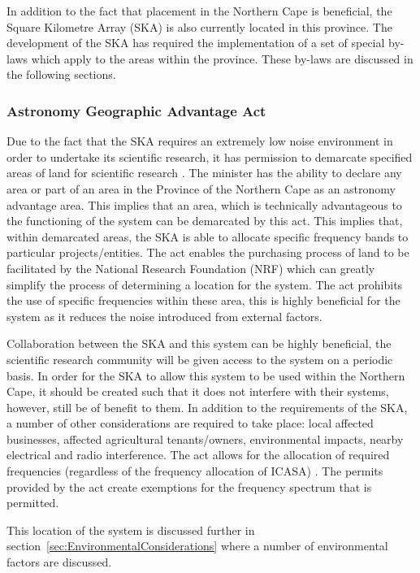 \documentclass[11pt]{witseiepaper}
\begin{document}
In addition to the fact that placement in the Northern Cape is beneficial, the Square Kilometre Array (SKA) is also currently located in this province. The development of the SKA has required the implementation of a set of special by-laws which apply to the areas within the province. These by-laws are discussed in the following sections.


\subsubsection{Astronomy Geographic Advantage Act} \label{sec:AstronomyGeographicAdvantageAct}
Due to the fact that the SKA requires an extremely low noise environment in order to undertake its scientific research, it has permission to demarcate specified areas of land for scientific research \cite{SKAActDescription}. 
The minister has the ability to declare any area or part of an area in the Province of the Northern Cape as an astronomy advantage area. This implies that an area, which is technically advantageous to the functioning of the system can be demarcated by this act. This implies that, within demarcated areas, the SKA is able to allocate specific frequency bands to particular projects/entities. 
The act enables the purchasing process of land to be facilitated by the National Research Foundation (NRF) which can greatly simplify the process of determining a location for the system. The act prohibits the use of specific frequencies within these area, this is highly beneficial for the system as it reduces the noise introduced from external factors.

Collaboration between the SKA and this system can be highly beneficial, the scientific research community will be given access to the system on a periodic basis. In order for the SKA to allow this system to be used within the Northern Cape, it should be created such that it does not interfere with their systems, however, still be of benefit to them. In addition to the requirements of the SKA, a number of other considerations are required to take place: local affected businesses, affected agricultural tenants/owners, environmental impacts, nearby electrical and radio interference.
The act allows for the allocation of required frequencies (regardless of the frequency allocation of ICASA) \cite{SKAAct}. The permits provided by the act create exemptions for the frequency spectrum that is permitted.

This location of the system is discussed further in section~\ref{sec:EnvironmentalConsiderations} where a number of environmental factors are discussed.
\end{document}
